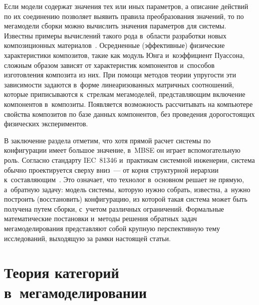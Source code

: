 \begin{multicols}{2}
   Если модели содержат значения тех или иных параметров, а описание 
действий по их соединению позволяет выявить правила преобразования 
значений, то по мегамодели сборки можно вы\-чис\-лить значения параметров для 
системы. Известны примеры вычислений такого рода в~области разработки 
новых композиционных материалов~\cite{12-kov}. Осредненные 
(эффективные) физические характеристики композитов, такие как модуль Юнга и~коэффициент Пуассона, сложным образом зависят от характеристик 
компонентов и~способов изготовления композита из них. При помощи методов 
теории упру\-гости эти зависимости задаются в~форме линеаризованных 
матричных соотношений, которые приписываются к~стрелкам мегамоделей, 
пред\-став\-ля\-ющим включение компонентов в~композиты. Появляется 
возможность рассчитывать на компьютере свойства композитов по базе данных 
компонентов, без проведения дорогостоящих физических экспериментов.
   
   В заключение раздела отметим, что хотя прямой расчет системы по 
конфигурации имеет большое значение, в~MBSE он играет вспомогательную 
роль. Согласно стандарту IEC~81346 и~практикам системной инженерии, 
система обычно проектируется сверху вниз~--- от корня структурной иерархии 
к~составляющим~\cite{13-kov}. Это означает, что технолог в~основном решает 
не прямую, а~обратную задачу: модель системы, которую нужно собрать, 
известна, а~нужно построить (восстановить) конфигурацию, из которой такая 
система может быть получена путем сборки, с~учетом различных ограничений. 
Формальные математические постановки и~методы решения обратных задач 
мегамоделирования представляют собой крупную перспективную тему 
исследований, выходящую за рамки настоящей статьи.

\section{Теория категорий в~мегамоделировании}


\end{multicols}
